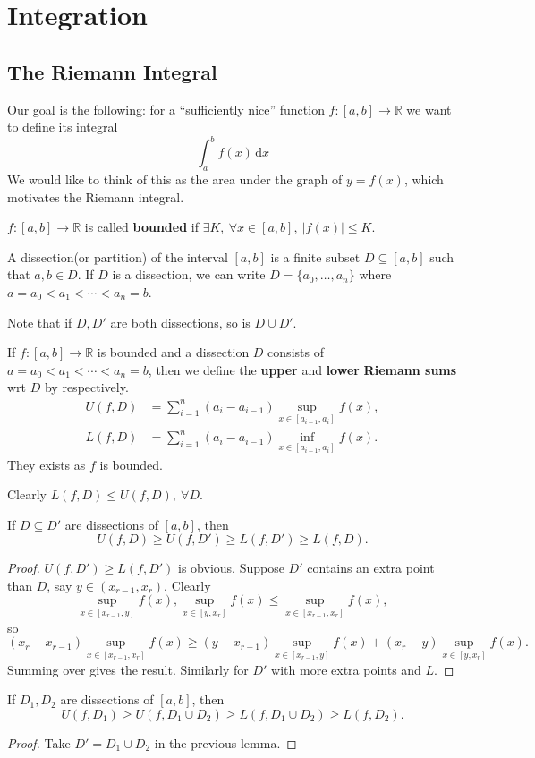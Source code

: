 \section{Integration}
\subsection{The Riemann Integral}
Our goal is the following: for a ``sufficiently nice'' function $f:[a,b]\to\mathbb R$ we want to define its integral
$$\int_a^bf(x)\,\mathrm dx$$
We would like to think of this as the area under the graph of $y=f(x)$, which motivates the Riemann integral.
\begin{definition}
    $f:[a,b]\to \mathbb{R}$ is called \textbf{bounded} if $ \exists K,\ \forall x\in [a,b],\ |f(x)|\le K $. 
\end{definition}
\begin{definition}
    A dissection(or partition) of the interval $[a,b]$ is a finite subset $D\subseteq [a,b]$ such that $a,b\in D$.
    If $D$ is a dissection, we can write $D=\{a_0,\ldots,a_n\}$ where $a=a_0<a_1<\cdots<a_n=b$.
\end{definition}
Note that if $D,D'$ are both dissections, so is $D\cup D'$.
\begin{definition}
    If $f:[a,b]\to\mathbb R$ is bounded and a dissection $D$ consists of $a=a_0<a_1<\cdots<a_n=b$, then we define the \textbf{upper} and \textbf{lower} \textbf{Riemann sums} wrt $D$ by
    respectively.
    \begin{align*}
        U(f,D)&=\sum_{i=1}^n(a_i-a_{i-1})\sup_{x\in [a_{i-1},a_i]}f(x),\\ 
        L(f,D)&=\sum_{i=1}^n(a_i-a_{i-1})\inf_{x\in [a_{i-1},a_i]}f(x).
    \end{align*}
    They exists as $f$ is bounded.
\end{definition}
Clearly $ L(f,D)\le U(f,D),\ \forall D $.
\begin{lemma}
    If $D\subseteq D'$ are dissections of $[a,b]$, then 
    \[
        U(f,D)\ge U(f,D')\ge L(f,D')\ge L(f,D).
    \]
\end{lemma}
\begin{proof}
    $U(f,D')\ge L(f,D')$ is obvious. Suppose $ D' $ contains an extra point than $D$, say $ y\in (x_{r-1},x_r) $. Clearly 
    \[
        \sup_{x\in [x_{r-1},y]}f(x),\sup_{x\in [y,x_r]}f(x)\le \sup_{x\in [x_{r-1},x_r]}f(x),
    \]
    so 
    \[
        (x_r-x_{r-1})\sup_{x\in [x_{r-1},x_r]}f(x)\ge (y-x_{r-1})\sup_{x\in [x_{r-1},y]}f(x)+(x_r-y)\sup_{x\in [y,x_r]}f(x).
    \]
    Summing over gives the result. Similarly for $D'$ with more extra points and $ L $.
\end{proof}
\begin{lemma}
    If $D_1,D_2$ are dissections of $[a,b]$, then
    \[
        U(f,D_1)\ge U(f,D_1 \cup D_2)\ge L(f,D_1 \cup D_2)\ge L(f,D_2).
    \]
\end{lemma}
\begin{proof}
    Take $ D'=D_1 \cup D_2 $ in the previous lemma.
\end{proof}

